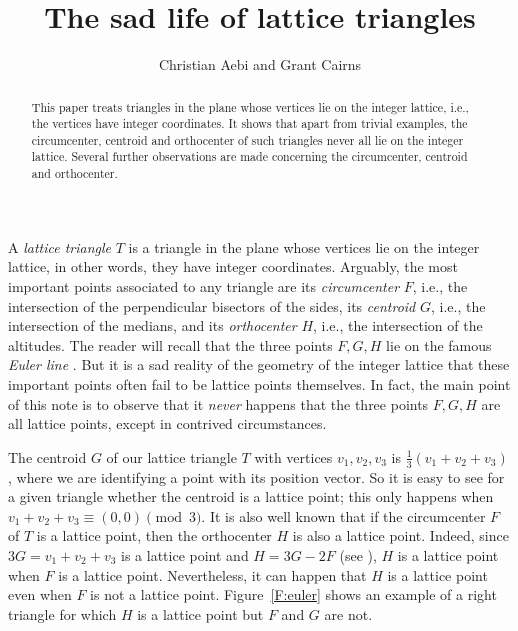 \documentclass[10pt,preprint]{amsart}
\theoremstyle{plain}
\theoremstyle{definition}
\theoremstyle{remark}
\begin{document}
\title{The sad life of lattice triangles}

\author{Christian Aebi and Grant Cairns}


\address{Coll\`ege Calvin, Geneva, Switzerland 1211}
\address{Department of Mathematical and Physical Sciences, La Trobe University, Melbourne, Australia 3086}


\begin{abstract}
This paper treats triangles in the plane whose vertices lie on the integer lattice, i.e., the vertices have integer coordinates.  
It shows that apart from trivial examples, the circumcenter, centroid and orthocenter of such triangles never all lie on the integer lattice.
Several further observations are made concerning the circumcenter, centroid and orthocenter.
 \end{abstract}



\maketitle


A \emph{lattice triangle} $T$ is  a triangle in the plane whose vertices lie on the integer lattice, in other words, they have integer coordinates. Arguably, the most important points associated to any triangle are  its  \emph{circumcenter} $F$, i.e., the intersection of the perpendicular bisectors of the sides,  its \emph{centroid} $G$, i.e., the intersection of the medians, and its \emph{orthocenter} $H$, i.e., the intersection of the altitudes. The reader will recall that the three points $F,G,H$ lie on the famous \emph{Euler line} \cite[p.~71]{AN}. But it is a sad reality of the geometry of the integer lattice that these important points often fail to be lattice points themselves. In fact, the main point of this note is to observe that it \emph{never} happens that the three points $F,G,H$ are all lattice points, except in contrived circumstances.

 The centroid $G$ of our lattice triangle $T$ with vertices $v_1,v_2,v_3$ is $\frac13(v_1+v_2+v_3)$, where we are identifying a point with its position vector. So it is easy to see for a given triangle whether the centroid is a lattice point; this only happens  when  $v_1+v_2+v_3\equiv (0,0) \pmod 3$.
It is also well known that 
if the circumcenter $F$ of $T$ is a lattice point, then the orthocenter $H$ is also a lattice point. Indeed, since $3G=v_1+v_2+v_3$ is a lattice point and 
$H=3G-2F$ (see \cite[p.~71]{AN}),  $H$ is a lattice point when $F$ is a lattice point.
Nevertheless, it can happen that $H$ is a lattice point even when $F$ is not a lattice point. Figure~\ref{F:euler} shows an example of a right triangle for which $H$ is a lattice point but $F$ and  $G$ are not.
\end{document}
